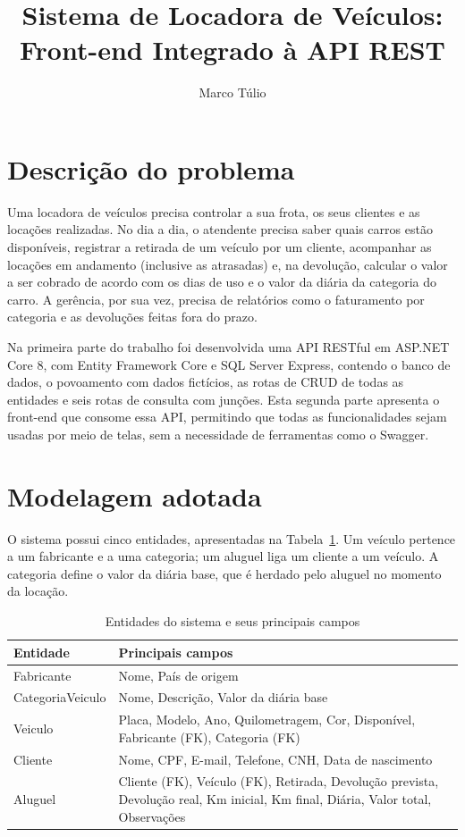 \documentclass[12pt]{article}
\title{Sistema de Locadora de Veículos:\\Front-end Integrado à API REST}
\author{Marco Túlio}
\begin{document}
\sloppy

\maketitle

\section{Descrição do problema}

Uma locadora de veículos precisa controlar a sua frota, os seus clientes e as locações realizadas. No dia a dia, o atendente precisa saber quais carros estão disponíveis, registrar a retirada de um veículo por um cliente, acompanhar as locações em andamento (inclusive as atrasadas) e, na devolução, calcular o valor a ser cobrado de acordo com os dias de uso e o valor da diária da categoria do carro. A gerência, por sua vez, precisa de relatórios como o faturamento por categoria e as devoluções feitas fora do prazo.

Na primeira parte do trabalho foi desenvolvida uma API RESTful em ASP.NET Core 8, com Entity Framework Core e SQL Server Express, contendo o banco de dados, o povoamento com dados fictícios, as rotas de CRUD de todas as entidades e seis rotas de consulta com junções. Esta segunda parte apresenta o front-end que consome essa API, permitindo que todas as funcionalidades sejam usadas por meio de telas, sem a necessidade de ferramentas como o Swagger.

\section{Modelagem adotada}

O sistema possui cinco entidades, apresentadas na Tabela~\ref{tab:entidades}. Um veículo pertence a um fabricante e a uma categoria; um aluguel liga um cliente a um veículo. A categoria define o valor da diária base, que é herdado pelo aluguel no momento da locação.

\begin{table}[H]
\centering
\caption{Entidades do sistema e seus principais campos}
\label{tab:entidades}
\begin{tabular}{|l|p{9.5cm}|}
\hline
\textbf{Entidade} & \textbf{Principais campos} \\ \hline
Fabricante & Nome, País de origem \\ \hline
CategoriaVeiculo & Nome, Descrição, Valor da diária base \\ \hline
Veiculo & Placa, Modelo, Ano, Quilometragem, Cor, Disponível, Fabricante (FK), Categoria (FK) \\ \hline
Cliente & Nome, CPF, E-mail, Telefone, CNH, Data de nascimento \\ \hline
Aluguel & Cliente (FK), Veículo (FK), Retirada, Devolução prevista, Devolução real, Km inicial, Km final, Diária, Valor total, Observações \\ \hline
\end{tabular}
\end{table}
\end{document}
